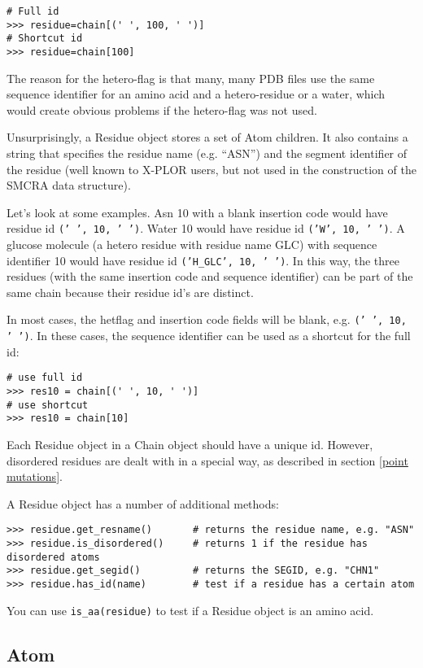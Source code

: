 \begin{verbatim}
# Full id
>>> residue=chain[(' ', 100, ' ')]
# Shortcut id
>>> residue=chain[100]
\end{verbatim}
The reason for the hetero-flag is that many, many PDB files use the
same sequence identifier for an amino acid and a hetero-residue or
a water, which would create obvious problems if the hetero-flag was
not used.

Unsurprisingly, a Residue object stores a set of Atom children. It also contains a string that specifies the residue name (e.g. ``ASN'')
and the segment identifier of the residue (well known to X-PLOR users, but not
used in the construction of the SMCRA data structure).

Let's look at some examples. Asn 10 with a blank insertion code would have residue
id {\tt (' ', 10, ' ')}. Water 10 would have residue id {\tt ('W', 10, ' ')}.
A glucose molecule (a hetero residue with residue name GLC) with sequence identifier
10 would have residue id {\tt ('H\_GLC', 10, ' ')}. In this way, the three
residues (with the same insertion code and sequence identifier) can be part
of the same chain because their residue id's are distinct.

In most cases, the hetflag and insertion code fields will be blank, e.g. {\tt (' ', 10, ' ')}.
In these cases, the sequence identifier can be used as a shortcut for the full
id:

\begin{verbatim}
# use full id
>>> res10 = chain[(' ', 10, ' ')]
# use shortcut
>>> res10 = chain[10]
\end{verbatim}

Each Residue object in a Chain object should have a unique id. However, disordered
residues are dealt with in a special way, as described in section \ref{point mutations}.

A Residue object has a number of additional methods:

\begin{verbatim}
>>> residue.get_resname()       # returns the residue name, e.g. "ASN"
>>> residue.is_disordered()     # returns 1 if the residue has disordered atoms
>>> residue.get_segid()	        # returns the SEGID, e.g. "CHN1"
>>> residue.has_id(name)        # test if a residue has a certain atom
\end{verbatim}

You can use \texttt{is\_aa(residue)} to test if a Residue object is an amino acid.

\subsection{Atom}

